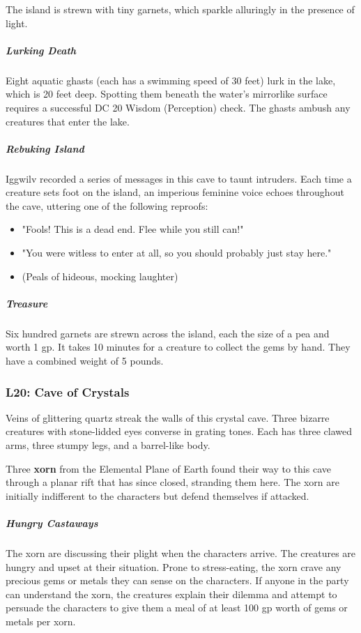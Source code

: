 \documentclass[10pt,a4paper,twoside,bg=print,twocolumn,openany,nodeprecatedcode]{dndbook}
\begin{document}
The island is strewn with tiny garnets, which sparkle alluringly in the presence of light.

\subparagraph{Lurking Death}
Eight aquatic ghasts (each has a swimming speed of 30 feet) lurk in the lake, which is 20 feet deep. Spotting them beneath the water's mirrorlike surface requires a successful DC 20 Wisdom (Perception) check. The ghasts ambush any creatures that enter the lake.

\subparagraph{Rebuking Island}
Iggwilv recorded a series of messages in this cave to taunt intruders. Each time a creature sets foot on the island, an imperious feminine voice echoes throughout the cave, uttering one of the following reproofs:


\begin{itemize}
\item "Fools! This is a dead end. Flee while you still can!"
\item "You were witless to enter at all, so you should probably just stay here."
\item (Peals of hideous, mocking laughter)
\end{itemize}

\subparagraph{Treasure}
Six hundred garnets are strewn across the island, each the size of a pea and worth 1 gp. It takes 10 minutes for a creature to collect the gems by hand. They have a combined weight of 5 pounds.

\subsubsection{L20: Cave of Crystals}
\begin{DndReadAloud}{}
Veins of glittering quartz streak the walls of this crystal cave. Three bizarre creatures with stone-lidded eyes converse in grating tones. Each has three clawed arms, three stumpy legs, and a barrel-like body.

\end{DndReadAloud}

Three \textbf{xorn} from the Elemental Plane of Earth found their way to this cave through a planar rift that has since closed, stranding them here. The xorn are initially indifferent to the characters but defend themselves if attacked.

\subparagraph{Hungry Castaways}
The xorn are discussing their plight when the characters arrive. The creatures are hungry and upset at their situation. Prone to stress-eating, the xorn crave any precious gems or metals they can sense on the characters. If anyone in the party can understand the xorn, the creatures explain their dilemma and attempt to persuade the characters to give them a meal of at least 100 gp worth of gems or metals per xorn.
\end{document}
